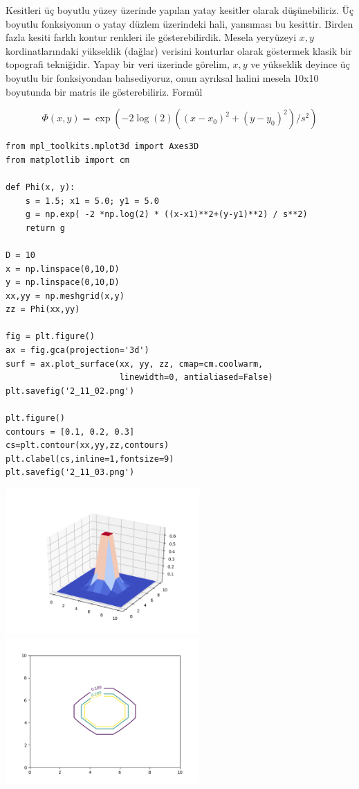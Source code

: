 \documentclass[12pt,fleqn]{article}\usepackage{../../common}
\begin{document}
Kesitleri üç boyutlu yüzey üzerinde yapılan yatay kesitler olarak
düşünebiliriz. Üç boyutlu fonksiyonun o yatay düzlem üzerindeki hali, yansıması
bu kesittir. Birden fazla kesiti farklı kontur renkleri ile gösterebilirdik.
Mesela yeryüzeyi $x,y$ kordinatlarındaki yükseklik (dağlar) verisini konturlar
olarak göstermek klasik bir topografi tekniğidir. Yapay bir veri üzerinde
görelim, $x,y$ ve yükseklik deyince üç boyutlu bir fonksiyondan bahsediyoruz,
onun ayrıksal halini mesela 10x10 boyutunda bir matris ile
gösterebiliriz. Formül

$$\Phi(x,y) = \exp \left( -2 \log(2) ((x-x_0)^2 + (y-y_0)^2) / s^2 \right) $$

\begin{verbatim}
from mpl_toolkits.mplot3d import Axes3D
from matplotlib import cm

def Phi(x, y):
    s = 1.5; x1 = 5.0; y1 = 5.0
    g = np.exp( -2 *np.log(2) * ((x-x1)**2+(y-y1)**2) / s**2)
    return g
  
D = 10
x = np.linspace(0,10,D)
y = np.linspace(0,10,D)
xx,yy = np.meshgrid(x,y)
zz = Phi(xx,yy)

fig = plt.figure()
ax = fig.gca(projection='3d')
surf = ax.plot_surface(xx, yy, zz, cmap=cm.coolwarm,
                       linewidth=0, antialiased=False)
plt.savefig('2_11_02.png')

plt.figure()
contours = [0.1, 0.2, 0.3]
cs=plt.contour(xx,yy,zz,contours)
plt.clabel(cs,inline=1,fontsize=9)
plt.savefig('2_11_03.png')
\end{verbatim}

\includegraphics[width=20em]{2_11_02.png}
\includegraphics[width=20em]{2_11_03.png}
\end{document}
